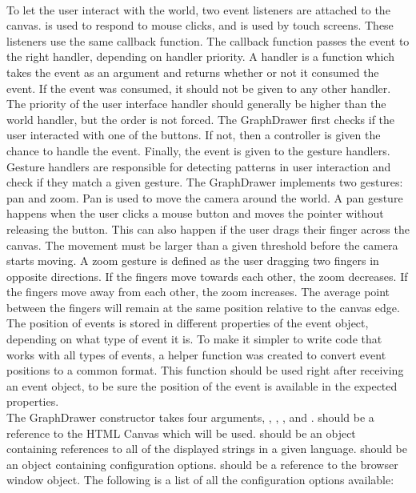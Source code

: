 \\[11pt]
To let the user interact with the world, two event listeners are attached to the canvas.  is used to respond to mouse clicks, and  is used by touch screens. These listeners use the same callback function. The callback function passes the event to the right handler, depending on handler priority. A handler is a function which takes the event as an argument and returns whether or not it consumed the event. If the event was consumed, it should not be given to any other handler. The priority of the user interface handler should generally be higher than the world handler, but the order is not forced. The GraphDrawer first checks if the user interacted with one of the buttons. If not, then a controller is given the chance to handle the event. Finally, the event is given to the gesture handlers. Gesture handlers are responsible for detecting patterns in user interaction and check if they match a given gesture. The GraphDrawer implements two gestures: pan and zoom. Pan is used to move the camera around the world. A pan gesture happens when the user clicks a mouse button and moves the pointer without releasing the button. This can also happen if the user drags their finger across the canvas. The movement must be larger than a given threshold before the camera starts moving. A zoom gesture is defined as the user dragging two fingers in opposite directions. If the fingers move towards each other, the zoom decreases. If the fingers move away from each other, the zoom increases. The average point between the fingers will remain at the same position relative to the canvas edge. The position of events is stored in different properties of the event object, depending on what type of event it is. To make it simpler to write code that works with all types of events, a helper function  was created to convert event positions to a common format. This function should be used right after receiving an event object, to be sure the position of the event is available in the expected properties.
\\[11pt]
The GraphDrawer constructor takes four arguments, , , , and .  should be a reference to the HTML Canvas which will be used.  should be an object containing references to all of the displayed strings in a given language.  should be an object containing configuration options.  should be a reference to the browser window object. The following is a list of all the configuration options available:
